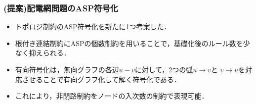 \documentclass[dvipdfmx,11pt]{beamer}
\begin{document}
\begin{frame}\frametitle{(提案)配電網問題のASP符号化}
 
\begin{itemize}
 \item  トポロジ制約のASP符号化を新たに1つ考案した．
\end{itemize}
 
\begin{table}[t]
 \centering
 
\end{table}

 \begin{itemize}
  \item 根付き連結制約にASPの個数制約を用いることで，基礎化後のルール数を少なく抑えられる．
  \item 有向符号化は，無向グラフの各辺$u-v$に対して，2つの弧$u\rightarrow v$と
        $v\rightarrow u$を対応させることで有向グラフ化して解く符号化である．
  \item これにより，非閉路制約をノードの入次数の制約で表現可能．
 \end{itemize}
\end{frame}
\end{document}
